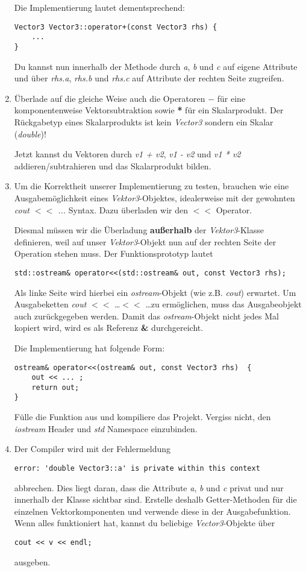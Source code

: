 \documentclass[
  accentcolor=tud1c,	%
  colorbacktitle,		%
  inverttitle,			%
  german,				%
  twoside
]{tudexercise}
\begin{document}
\begin{enumerate}
Die Implementierung lautet dementsprechend:
\begin{lstlisting}
Vector3 Vector3::operator+(const Vector3 rhs) {
	...
}
\end{lstlisting}

Du kannst nun innerhalb der Methode durch \emph{a}, \emph{b} und \emph{c} auf eigene Attribute und über  \emph{rhs.a}, \emph{rhs.b} und \emph{rhs.c} auf Attribute der rechten Seite zugreifen.

\item
Überlade auf die gleiche Weise auch die Operatoren $-$ für eine komponentenweise Vektorsubtraktion sowie \textbf{*} für ein Skalarprodukt.
Der Rückgabetyp eines Skalarprodukts ist kein \emph{Vector3} sondern ein Skalar (\emph{double})!

Jetzt kannst du Vektoren durch \emph{v1 + v2}, \emph{v1 - v2} und \emph{v1 * v2} addieren/subtrahieren und das Skalarprodukt bilden.

\item
Um die Korrektheit unserer Implementierung zu testen, brauchen wie eine Ausgabemöglichkeit eines \emph{Vektor3}-Objektes, idealerweise mit der gewohnten \emph{cout \textbf{$<<$} ...} Syntax.
Dazu überladen wir den \textbf{$<<$} Operator.

Diesmal müssen wir die Überladung \textbf{außerhalb} der \emph{Vektor3}-Klasse definieren, weil auf unser \emph{Vektor3}-Objekt nun auf der rechten Seite der Operation stehen muss. Der Funktionsprototyp lautet 
\begin{lstlisting}
std::ostream& operator<<(std::ostream& out, const Vector3 rhs);
\end{lstlisting}

Als linke Seite wird hierbei ein \emph{ostream}-Objekt (wie z.B. \emph{cout}) erwartet.
Um Ausgabeketten \emph{cout} \textbf{$<<$} \dots \textbf{$<<$} \dots zu ermöglichen, muss das Ausgabeobjekt auch zurückgegeben werden. Damit das \emph{ostream}-Objekt nicht jedes Mal kopiert wird, wird es als Referenz \textbf{\&} durchgereicht.

Die Implementierung hat folgende Form:
\begin{lstlisting}
ostream& operator<<(ostream& out, const Vector3 rhs)  {
	out << ... ;
	return out;
}
\end{lstlisting}

Fülle die Funktion aus und kompiliere das Projekt.
Vergiss nicht, den \emph{iostream} Header und \emph{std} Namespace einzubinden.

\item
Der Compiler wird mit der Fehlermeldung 
\begin{verbatim}
error: 'double Vector3::a' is private within this context
\end{verbatim}
abbrechen.
Dies liegt daran, dass die Attribute \emph{a}, \emph{b} und \emph{c} privat und nur innerhalb der Klasse sichtbar sind.
Erstelle deshalb Getter-Methoden für die einzelnen Vektorkomponenten und verwende diese in der Ausgabefunktion.
Wenn alles funktioniert hat, kannst du beliebige \emph{Vector3}-Objekte über 
\begin{lstlisting}
cout << v << endl;
\end{lstlisting} 
ausgeben.


\end{enumerate}
\end{document}
